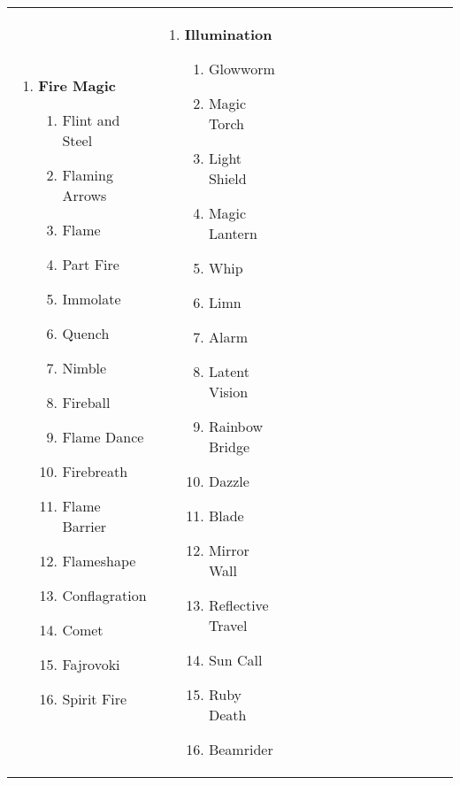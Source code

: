\renewcommand{\labelenumii}{\arabic{enumii}.}
\begin{tabular}{@{} p{0.25\linewidth} p{0.25\linewidth} p{0.25\linewidth} p{0.25\linewidth}}
\begin{enumerate}
	\item \textbf{Fire Magic}
	\begin{enumerate}
		\item Flint and Steel
		\item Flaming Arrows
		\item Flame
		\item Part Fire
		\item Immolate
		\item Quench
		\item Nimble
		\item Fireball
		\item Flame Dance
		\item Firebreath
		\item Flame Barrier
		\item Flameshape
		\item Conflagration
		\item Comet
		\item Fajrovoki
		\item Spirit Fire
	\end{enumerate}
\end{enumerate} &
\begin{enumerate}
	\item \textbf{Illumination}
	\begin{enumerate}
		\item Glowworm
		\item Magic Torch
		\item Light Shield
		\item Magic Lantern
		\item Whip
		\item Limn
		\item Alarm
		\item Latent Vision
		\item Rainbow Bridge
		\item Dazzle
		\item Blade
		\item Mirror Wall
		\item Reflective Travel
		\item Sun Call
		\item Ruby Death
		\item Beamrider
	\end{enumerate}
\end{enumerate} &

\end{tabular}
